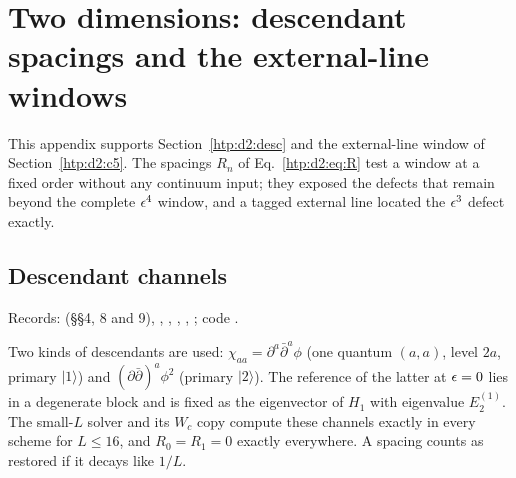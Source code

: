 \section{Two dimensions: descendant spacings and the external-line windows}\label{htp:d2:app:legs}

This appendix supports Section~\ref{htp:d2:desc} and the external-line window of Section~\ref{htp:d2:c5}. The spacings $R_n$ of
Eq.~\eqref{htp:d2:eq:R} test a window at a fixed order without any continuum input; they exposed the defects that remain beyond
the complete $\epsilon^4$ window, and a tagged external line located the $\epsilon^3$ defect exactly.

\subsection{Descendant channels}\label{htp:d2:app:desc}
{\small\raggedright\noindent Records:  (\S\S4, 8 and 9),
,
, ,
, ; code .\par}

Two kinds of descendants are used: $\chi_{aa}=\partial^a\bar\partial^a\phi$ (one quantum $(a,a)$, level $2a$, primary
$|1\rangle$) and $(\partial\bar\partial)^a\phi^2$ (primary $|2\rangle$). The reference of the latter at $\epsilon=0$ lies in a
degenerate block and is fixed as the eigenvector of $H_1$ with eigenvalue $E_2^{(1)}$. The small-$L$ solver
 and its $W_c$ copy  compute these channels exactly in every scheme for
$L\le16$, and $R_0=R_1=0$ exactly everywhere. A spacing counts as restored if it decays like $1/L$.

